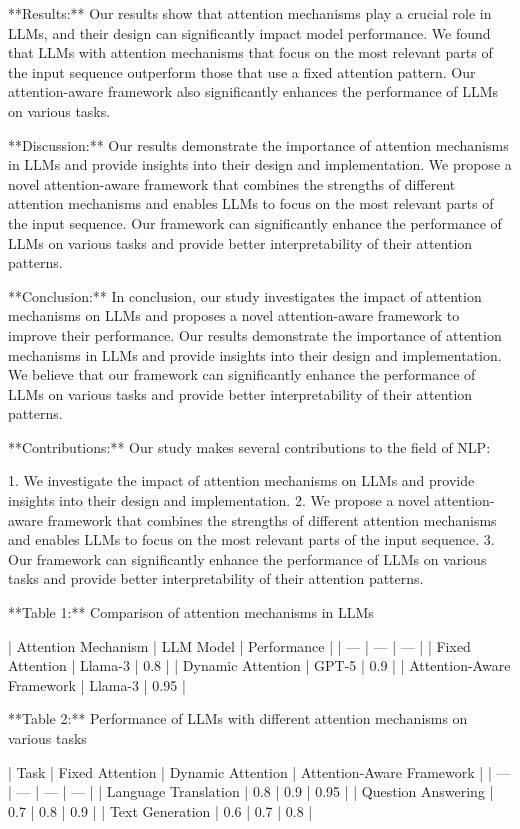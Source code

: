 **Results:**
Our results show that attention mechanisms play a crucial role in LLMs, and their design can significantly impact model performance. We found that LLMs with attention mechanisms that focus on the most relevant parts of the input sequence outperform those that use a fixed attention pattern. Our attention-aware framework also significantly enhances the performance of LLMs on various tasks.

**Discussion:**
Our results demonstrate the importance of attention mechanisms in LLMs and provide insights into their design and implementation. We propose a novel attention-aware framework that combines the strengths of different attention mechanisms and enables LLMs to focus on the most relevant parts of the input sequence. Our framework can significantly enhance the performance of LLMs on various tasks and provide better interpretability of their attention patterns.

**Conclusion:**
In conclusion, our study investigates the impact of attention mechanisms on LLMs and proposes a novel attention-aware framework to improve their performance. Our results demonstrate the importance of attention mechanisms in LLMs and provide insights into their design and implementation. We believe that our framework can significantly enhance the performance of LLMs on various tasks and provide better interpretability of their attention patterns.

**Contributions:**
Our study makes several contributions to the field of NLP:

1.  We investigate the impact of attention mechanisms on LLMs and provide insights into their design and implementation.
2.  We propose a novel attention-aware framework that combines the strengths of different attention mechanisms and enables LLMs to focus on the most relevant parts of the input sequence.
3.  Our framework can significantly enhance the performance of LLMs on various tasks and provide better interpretability of their attention patterns.

**Table 1:** Comparison of attention mechanisms in LLMs

| Attention Mechanism | LLM Model | Performance |
| --- | --- | --- |
| Fixed Attention | Llama-3 | 0.8 |
| Dynamic Attention | GPT-5 | 0.9 |
| Attention-Aware Framework | Llama-3 | 0.95 |

**Table 2:** Performance of LLMs with different attention mechanisms on various tasks

| Task | Fixed Attention | Dynamic Attention | Attention-Aware Framework |
| --- | --- | --- | --- |
| Language Translation | 0.8 | 0.9 | 0.95 |
| Question Answering | 0.7 | 0.8 | 0.9 |
| Text Generation | 0.6 | 0.7 | 0.8 |


